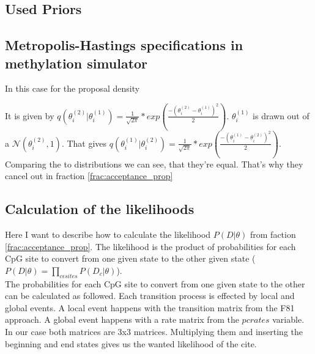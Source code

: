 \documentclass[12pt]{article} %
\begin{document}
	\subsection{Used Priors}
	
	\subsection{Metropolis-Hastings specifications in methylation simulator}
	In this case for the proposal density
	
	It is given by $q(\theta_i^{(2)}|\theta_i^{(1)}) = \frac{1}{\sqrt{2\pi}} * exp(\frac{-(\theta_i^{(2)}-\theta_i^{(1)})^2}{2})$. $\theta^{(1)}_{i}$ is drawn out of a $\mathcal{N}(\theta^{(2)}_{i},1)$. That gives $q(\theta_i^{(1)}|\theta_i^{(2)}) = \frac{1}{\sqrt{2\pi}} * exp(\frac{-(\theta_i^{(1)}-\theta_i^{(2)})^2}{2})$. Comparing the to distributions we can see, that they're equal. That's why they cancel out in fraction \ref{frac:acceptance_prop}
	
	
	\subsection{Calculation of the likelihoods}
	Here I want to describe how to calculate the likelihood $P(D|\theta)$ from faction \ref{frac:acceptance_prop}.
	The likelihood is the product of probabilities for each CpG site to convert from one given state to the other given state ($P(D|\theta) = \prod_{c\epsilon sites}P(D_c|\theta)$). \\
	The probabilities for each CpG site to convert from one given state to the other can be calculated as followed. Each transition process is effected by local and global events. A local event happens with the transition matrix from the F81 approach. A global event happens with a rate matrix from the $pcrates$ variable. In our case both matrices are 3x3 matrices. Multiplying them and inserting the beginning and end states gives us the wanted likelihood of the cite.
	
\end{document}
